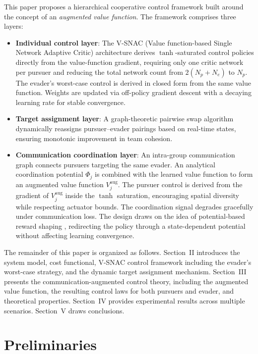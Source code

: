 \documentclass[conference]{IEEEtran}
\begin{document}
This paper proposes a hierarchical cooperative control framework built around the concept of an \emph{augmented value function}. The framework comprises three layers:
\begin{itemize}
\item \textbf{Individual control layer}: The V-SNAC (Value function-based Single Network Adaptive Critic) architecture derives $\tanh$-saturated control policies directly from the value-function gradient, requiring only one critic network per pursuer and reducing the total network count from $2(N_p + N_e)$ to $N_p$. The evader's worst-case control is derived in closed form from the same value function. Weights are updated via off-policy gradient descent with a decaying learning rate for stable convergence.
\item \textbf{Target assignment layer}: A graph-theoretic pairwise swap algorithm dynamically reassigns pursuer--evader pairings based on real-time states, ensuring monotonic improvement in team cohesion.
\item \textbf{Communication coordination layer}: An intra-group communication graph connects pursuers targeting the same evader. An analytical coordination potential $\Phi_j$ is combined with the learned value function to form an augmented value function $V_j^{\mathrm{aug}}$. The pursuer control is derived from the gradient of $V_j^{\mathrm{aug}}$ inside the $\tanh$ saturation, encouraging spatial diversity while respecting actuator bounds. The coordination signal degrades gracefully under communication loss. The design draws on the idea of potential-based reward shaping \cite{b_ng1999}, redirecting the policy through a state-dependent potential without affecting learning convergence.
\end{itemize}

The remainder of this paper is organized as follows. Section~II introduces the system model, cost functional, V-SNAC control framework including the evader's worst-case strategy, and the dynamic target assignment mechanism. Section~III presents the communication-augmented control theory, including the augmented value function, the resulting control laws for both pursuers and evader, and theoretical properties. Section~IV provides experimental results across multiple scenarios. Section~V draws conclusions.


\section{Preliminaries}
\end{document}

